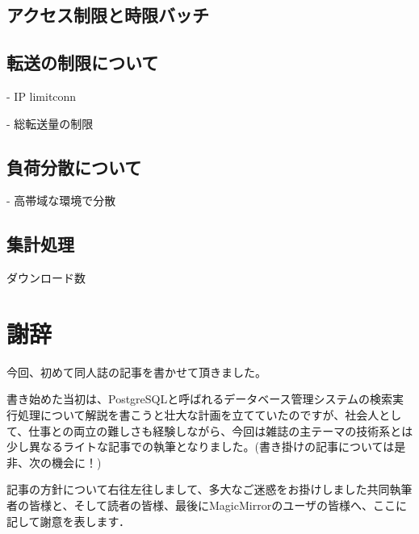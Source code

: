  

\subsection{アクセス制限と時限バッチ}

 

 

\subsection{転送の制限について}

- IP limitconn

- 総転送量の制限

 

 

\subsection{負荷分散について}

- 高帯域な環境で分散

 

 

\subsection{集計処理}

ダウンロード数

 


%




 

\section{謝辞}

今回、初めて同人誌の記事を書かせて頂きました。

書き始めた当初は、PostgreSQLと呼ばれるデータベース管理システムの検索実行処理について解説を書こうと壮大な計画を立てていたのですが、社会人として、仕事との両立の難しさも経験しながら、今回は雑誌の主テーマの技術系とは少し異なるライトな記事での執筆となりました。(書き掛けの記事については是非、次の機会に！)

 

記事の方針について右往左往しまして、多大なご迷惑をお掛けしました共同執筆者の皆様と、そして読者の皆様、最後にMagicMirrorのユーザの皆様へ、ここに記して謝意を表します．